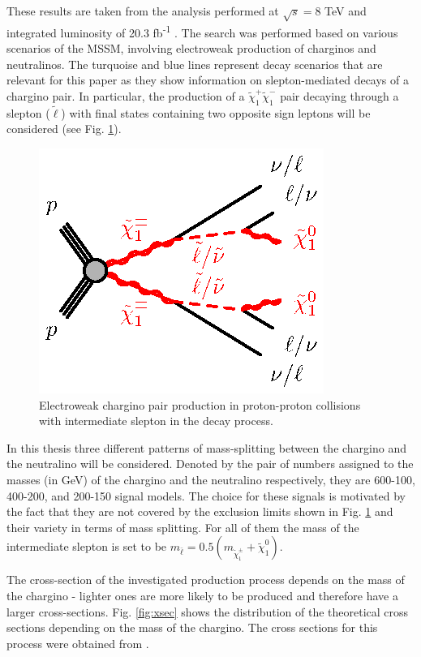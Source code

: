 These results are taken from the  analysis performed at $\sqrt{s}=$8 TeV and integrated luminosity of 20.3 fb\textsuperscript{-1} \citep{atlas2015search}. The search was performed based on various scenarios of the MSSM, involving electroweak production of charginos and neutralinos. The turquoise and blue lines represent decay scenarios that are relevant for this paper as they show information on slepton-mediated decays of a chargino pair. 
In particular, the production of a  $\tilde{\chi}^{+}_{1}\tilde{\chi}^{-}_{1}$ pair decaying through a slepton ($\tilde{\ell}$) with final states containing two opposite sign leptons will be considered (see Fig. \ref{fig:EWchargino}). 
\begin{figure}[!h]
  \centering   	
  	\captionsetup{width=0.8\textwidth}
	\includegraphics[]{Chap2/C1C1-llvvN1N1-slsnu}	
\caption[Feynman diagram of slepton-mediated chargino decay]{Electroweak chargino pair production in proton-proton collisions with intermediate slepton in the decay process.}\label{fig:EWchargino}
\end{figure}  

In this thesis three different patterns of mass-splitting between the chargino and the neutralino will be considered. Denoted by the pair of numbers assigned to the masses (in GeV) of the chargino and the neutralino respectively, they are 600-100, 400-200, and 200-150 signal models. The choice for these signals is motivated by the fact that they are not covered by the exclusion limits shown in Fig. \ref{fig:EWchargino} and their variety in terms of mass splitting.
For all of them the mass of the intermediate slepton is set to be $m_{\bar{\ell}} = 0.5(m_{\tilde{\chi}_1^{\pm}}+\tilde{\chi}_1^{0})$. 

The cross-section of the investigated production process depends on the mass of the chargino - lighter ones are more likely to be produced and therefore have a larger cross-sections. Fig. \ref{fig:xsec} shows the distribution of the theoretical cross sections depending on the mass of the chargino.
The cross sections for this process were obtained from \citep{Fuks:2012qx,Fuks:2013vua}. 

